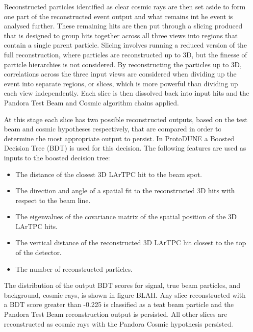 Reconstructed particles identified as clear cosmic rays are then set aside to form one part of the reconstructed event output and what remains int he event is analysed further.  These remaining hits are then put through a slicing produced that is designed to group hits together across all three views into regions that contain a single parent particle.  Slicing involves running a reduced version of the full reconstruction, where particles are reconstructed up to 3D, but the finesse of particle hierarchies is not considered.  By reconstructing the particles up to 3D, correlations across the three input views are considered when dividing up the event into separate regions, or slices, which is more powerful than dividing up each view independently.  Each slice is then dissolved back into input hits and the Pandora Test Beam and Cosmic algorithm chains applied.  

At this stage each slice has two possible reconstructed outputs, based on the test beam and cosmic hypotheses respectively, that are compared in order to determine the most appropriate output to persist.  In ProtoDUNE a Boosted Decision Tree (BDT) is used for this decision.  The following features are used as inputs to the boosted decision tree:

\begin{itemize}
\item The distance of the closest 3D LArTPC hit to the beam spot.
\item The direction and angle of a spatial fit to the reconstructed 3D hits with respect to the beam line.
\item The eigenvalues of the covariance matrix of the spatial position of the 3D LArTPC hits.
\item The vertical distance of the reconstructed 3D LArTPC hit closest to the top of the detector.
\item The number of reconstructed particles.
\end{itemize}

The distribution of the output BDT scores for signal, true beam particles, and background, cosmic rays, is shown in figure BLAH.  Any slice reconstructed with a BDT score greater than  -0.225 is classified as a teat beam particle and the Pandora Test Beam reconstruction output is persisted.  All other slices are reconstructed as cosmic rays with the Pandora Cosmic hypothesis persisted.  

